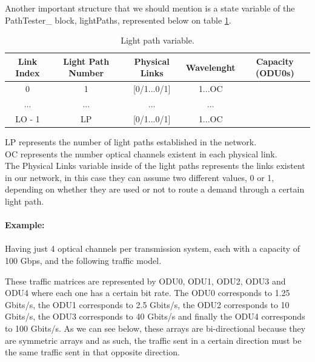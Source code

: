 Another important structure that we should mention is a state variable of the PathTester\_  block, lightPaths, represented below on table \ref{lightpath_example}.
\begin{table}[H]
	\centering
	\begin{tabular}{|c|c|c|c|c|}
		\hline
		Link Index & Light Path Number & Physical Links  & Wavelenght & Capacity (ODU0s) \\ \hline
		0          & 1                 & {[}0/1...0/1{]} & 1...OC     &                  \\ \hline
		...        & ...               & ...             & ...        &                  \\ \hline
		LO - 1         & LP                & {[}0/1...0/1{]} & 1...OC     &                  \\ \hline
	\end{tabular}
	\caption{Light path variable.}
	\label{lightpath_example}
\end{table}
LP represents the number of light paths established in the network.\\
OC represents the number optical channels existent in each physical link.\\
The Physical Links variable inside of the light paths represents the links existent in our network, in this case they can assume two different values, 0 or 1, depending on whether they are used or not to route a demand through a certain light path.\\ \\
\clearpage
\textbf{Example:}  \\
\\
Having just 4 optical channels per transmission system, each with a capacity of 100 Gbps, and the following traffic model.

These traffic matrices are represented by ODU0, ODU1, ODU2, ODU3 and ODU4 where each one has a certain bit rate.
The ODU0 corresponds to 1.25 Gbits/s, the ODU1 corresponds to 2.5 Gbits/s, the ODU2 corresponds to 10 Gbits/s, the ODU3 corresponds to 40 Gbits/s and finally the ODU4 corresponds to 100 Gbits/s.
As we can see below, these arrays are bi-directional because they are symmetric arrays and as such, the traffic sent in a certain direction must be the same traffic sent in that opposite direction.


